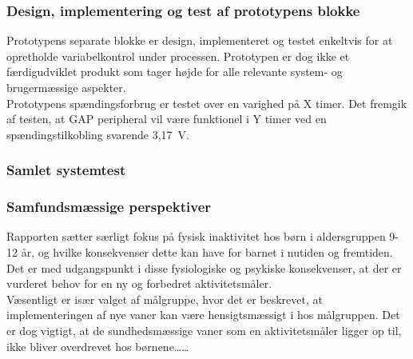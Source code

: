 \subsubsection{Design, implementering og test af prototypens blokke}
Prototypens separate blokke er design, implementeret og testet enkeltvis for at opretholde variabelkontrol under processen. Prototypen er dog ikke et færdigudviklet produkt som tager højde for alle relevante system- og brugermæssige aspekter. \\
Prototypens spændingsforbrug er testet over en varighed på X timer. Det fremgik af testen, at GAP peripheral vil være funktionel i Y timer ved en spændingstilkobling svarende 3,17~V.  


\subsubsection{Samlet systemtest}



\subsubsection{Samfundsmæssige perspektiver}
Rapporten sætter særligt fokus på fysisk inaktivitet hos børn i aldersgruppen 9-12 år, og hvilke konsekvenser dette kan have for barnet i nutiden og fremtiden. Det er med udgangspunkt i disse fysiologiske og psykiske konsekvenser, at der er vurderet behov for en ny og forbedret aktivitetsmåler. \\
Væsentligt er især valget af målgruppe, hvor det er beskrevet, at implementeringen af nye vaner kan være hensigtsmæssigt i hos målgruppen. Det er dog vigtigt, at de sundhedsmæssige vaner som en aktivitetsmåler ligger op til, ikke bliver overdrevet hos børnene……
